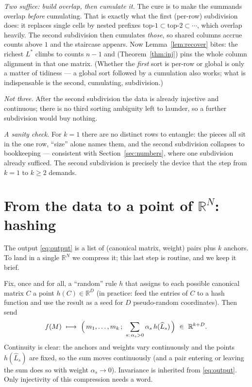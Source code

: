 \documentclass[11pt,a4paper]{article}
\theoremstyle{definition}
\theoremstyle{plain}
\newcommand{\R}{\mathbb{R}}
\newcommand{\bary}{\widehat}      %
\begin{document}
\emph{Two suffice: build overlap, then cumulate it.} The cure is to make the
summands overlap \emph{before} cumulating. That is exactly what the first
(per-row) subdivision does: it replaces single cells by nested prefixes
$\text{top-}1\subset\text{top-}2\subset\cdots$, which overlap heavily. The second
subdivision then cumulates \emph{those}, so shared columns accrue counts above
$1$ and the staircase appears. Now Lemma~\ref{lem:recover} bites: the richest
$L^\ast$ climbs to counts $n-1$ and (Theorem~\ref{thm:inj}) pins the whole
column alignment in that one matrix. (Whether the \emph{first} sort is per-row or
global is only a matter of tidiness --- a global sort followed by a cumulation
also works; what is indispensable is the second, cumulating, subdivision.)

\emph{Not three.} After the second subdivision the data is already injective and
continuous; there is no third sorting ambiguity left to launder, so a further
subdivision would buy nothing.

\emph{A sanity check.} For $k=1$ there are no distinct rows to entangle: the
pieces all sit in the one row, ``size'' alone names them, and the second
subdivision collapses to bookkeeping --- consistent with
Section~\ref{sec:numbers}, where one subdivision already sufficed. The second
subdivision is precisely the device that the step from $k=1$ to $k\ge2$ demands.

\section{From the data to a point of $\R^N$: hashing}
\label{sec:hash}

The output \eqref{eq:output} is a list of (canonical matrix, weight) pairs plus
$k$ anchors. To land in a single $\R^N$ we compress it; this last step is
routine, and we keep it brief.

Fix, once and for all, a ``random'' rule $h$ that assigns to each possible
canonical matrix $C$ a point $h(C)\in\R^{D}$ (in practice: feed the entries of
$C$ to a hash function and use the result as a seed for $D$ pseudo-random
coordinates). Then send
\begin{equation}\label{eq:hash}
   f(M)\ \longmapsto\
   \Bigl(\,m_1,\dots,m_k\,;\ \sum_{s:\,\alpha_s>0}\alpha_s\,h(\bary L_s)\,\Bigr)
   \ \in\ \R^{k+D}.
\end{equation}
Continuity is clear: the anchors and weights vary continuously and the points
$h(\bary L_s)$ are fixed, so the sum moves continuously (and a pair entering or
leaving the sum does so with weight $\alpha_s\to0$). Invariance is inherited from
\eqref{eq:output}. Only injectivity of this compression needs a word.
\end{document}

